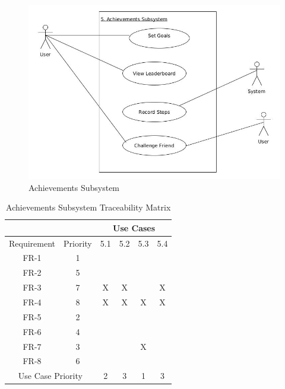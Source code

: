 \documentclass{article}
\begin{document}
\begin{enumerate}
\begin{enumerate}
\begin{enumerate}
		\end{enumerate}			
	\end{enumerate}	
	
	\begin{figure}[H]
		\includegraphics[scale=0.5]{Achievements_Subsystem.jpg}
		\caption{Achievements Subsystem}	
	\end{figure}  
		\begin{table}[H]
 \centering
 \caption{Achievements Subsystem Traceability Matrix}
 \label{my-label}
 \begin{tabular}{cc|c|c|c|c|}
 \cline{3-6}
                                   &          & \multicolumn{4}{c|}{Use Cases} \\ \hline
 \multicolumn{1}{|c|}{Requirement} & Priority & 5.1    & 5.2   & 5.3   & 5.4   \\ \hline
 \multicolumn{1}{|c|}{FR-1}        & 1        &        &       &       &       \\ \hline
 \multicolumn{1}{|c|}{FR-2}        & 5        &        &       &       &       \\ \hline
 \multicolumn{1}{|c|}{FR-3}        & 7        & X      & X     &       & X     \\ \hline
 \multicolumn{1}{|c|}{FR-4}        & 8        & X      & X     & X     & X     \\ \hline
 \multicolumn{1}{|c|}{FR-5}        & 2        &        &       &       &       \\ \hline
 \multicolumn{1}{|c|}{FR-6}        & 4        &        &       &       &       \\ \hline
 \multicolumn{1}{|c|}{FR-7}        & 3        &        &       & X     &       \\ \hline
 \multicolumn{1}{|c|}{FR-8}        & 6        &        &       &       &       \\ \hline
 \multicolumn{2}{|c|}{Use Case Priority}      & 2      & 3     & 1     & 3     \\ \hline
 \end{tabular}
 \end{table}
 \newpage
 

\end{enumerate}
\end{document}
